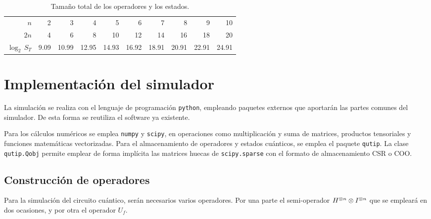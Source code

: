 \begin{ejemplo}
\begin{table}[h]
	\centering
	\begin{tabular}{*{10}{r}}
		\toprule
$n$ & 2	& 3	& 4	& 5	& 6	& 7	& 8	& 9	& 10 \\
$2n$& 4	& 6	& 8	& 10	& 12	& 14	& 16	& 18	& 20 \\
$\log_2 \, S_T$ & 9.09	& 10.99	& 12.95	& 14.93	& 16.92	& 18.91	& 20.91	& 22.91	
& 24.91 \\
		\bottomrule
	\end{tabular}
	\caption{Tamaño total de los operadores y los estados.}
\end{table}


\end{ejemplo}

\section{Implementación del simulador}

La simulación se realiza con el lenguaje de programación \texttt{python}, 
empleando paquetes externos que aportarán las partes comunes del simulador. De 
esta forma se reutiliza el software ya existente.

Para los cálculos numéricos se emplea \texttt{numpy} y \texttt{scipy}, en 
operaciones como multiplicación y suma de matrices, productos tensoriales y 
funciones matemáticas vectorizadas. Para el almacenamiento de operadores y 
estados cuánticos, se emplea el paquete \texttt{qutip}. La clase 
\texttt{qutip.Qobj} permite emplear de forma implícita las matrices huecas de 
\texttt{scipy.sparse} con el formato de almacenamiento CSR o COO.

%

\subsection{Construcción de operadores}
Para la simulación del circuito cuántico, serán necesarios varios operadores.
Por una parte el semi-operador ${H}^{\otimes n} \otimes {I}^{\otimes n}$ que se empleará en 
dos ocasiones, y por otra el operador $U_f$.


